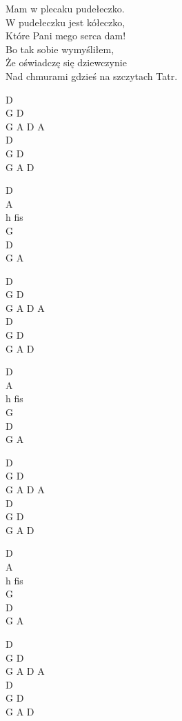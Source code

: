 \begin{text}
    \vin Mam w plecaku pudełeczko.\\
    \vin W pudełeczku jest kółeczko,\\
    \vin Które Pani mego serca dam!\\
    \vin Bo tak sobie wymyśliłem,\\
    \vin Że oświadczę się dziewczynie\\
    \vin Nad chmurami gdzieś na szczytach Tatr.


\end{text}
\begin{chord}
    D\\
    G D\\
    G A D A\\
    D\\
    G D\\
    G A D

    D\\
    A\\
    h fis\\
    G\\
    D\\
    G A

    D\\
    G D\\
    G A D A\\
    D\\
    G D\\
    G A D

    D\\
    A\\
    h fis\\
    G\\
    D\\
    G A

    D\\
    G D\\
    G A D A\\
    D\\
    G D\\
    G A D

    D\\
    A\\
    h fis\\
    G\\
    D\\
    G A

    D\\
    G D\\
    G A D A\\
    D\\
    G D\\
    G A D
\end{chord}